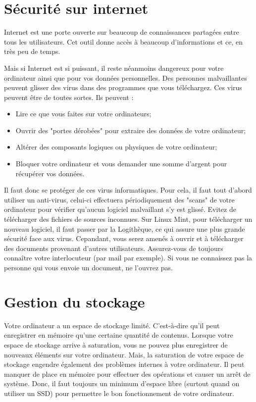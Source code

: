 \documentclass[12pt]{book}
\begin{document}
	\section{Sécurité sur internet}
		Internet est une porte ouverte sur beaucoup de connaissances partagées entre tous les utilisateurs.
		Cet outil donne accès à beaucoup d'informations et ce, en très peu de temps.\par
		Mais si Internet est si puissant, il reste néanmoins dangereux pour votre ordinateur ainsi que pour vos données personnelles.
		Des personnes malvaillantes peuvent glisser des virus dans des programmes que vous téléchargez.
		Ces virus peuvent être de toutes sortes. Ils peuvent :
		\begin{itemize}
			\item Lire ce que vous faites sur votre ordinateurs; 
			\item Ouvrir des "portes dérobées" pour extraire des données de votre ordinateur;
			\item Altérer des composants logiques ou physiques de votre ordinateur;
			\item Bloquer votre ordinateur et vous demander une somme d'argent pour récupérer vos données.
		\end{itemize}
		Il faut donc se protéger de ces virus informatiques.
		Pour cela, il faut tout d'abord utiliser un anti-virus, celui-ci effectuera périodiquement des "scans" de votre ordinateur pour vérifier qu'aucun logiciel malvaillant s'y est glissé.
		Evitez de télécharger des fichiers de sources inconnues.
		Sur Linux Mint, pour télécharger un nouveau logiciel, il faut passer par la Logithèque, ce qui assure une plus grande sécurité face aux virus.
		Cepandant, vous serez amenés à ouvrir et à télécharger des documents provenant d'autres utilisateurs.
		Assurez-vous de toujours connaître votre interlocuteur (par mail par exemple). 
		Si vous ne connaissez pas la personne qui vous envoie un document, ne l'ouvrez pas.
	\section{Gestion du stockage}
		Votre ordinateur a un espace de stockage limité.
		C'est-à-dire qu'il peut enregistrer en mémoire qu'une certaine quantité de contenus.
		Lorsque votre espace de stockage arrive à saturation, vous ne pouvez plus enregistrer de nouveaux éléments sur votre ordinateur.
		Mais, la saturation de votre espace de stockage engendre également des problèmes internes à votre ordinateur.
		Il peut manquer de place en mémoire pour effectuer des opérations et causer un arrêt de système.
		Donc, il faut toujours un minimum d'espace libre (surtout quand on utiliser un SSD) pour permettre le bon fonctionnement de votre ordinateur.
\end{document}
